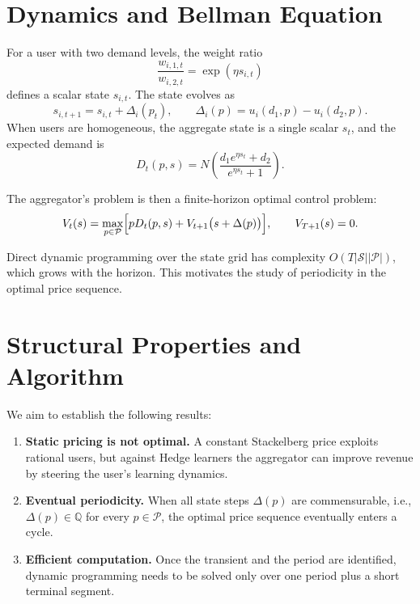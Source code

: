 \documentclass[conference]{IEEEtran}
\begin{document}
\section{Dynamics and Bellman Equation}
For a user with two demand levels, the weight ratio
\begin{equation}
    \frac{w_{i,1,t}}{w_{i,2,t}} = \exp(\eta s_{i,t})
\end{equation}
defines a scalar state $s_{i,t}$. The state evolves as
\begin{equation}
    s_{i,t+1} = s_{i,t} + \Delta_i(p_t),
\qquad
    \Delta_i(p) = u_i(d_1, p) - u_i(d_2, p).
\end{equation}
When users are homogeneous, the aggregate state is a single scalar $s_t$, and the expected demand is
\begin{equation}
    D_t(p, s) = N \left( \frac{d_1 e^{\eta s_t} + d_2}{e^{\eta s_t} + 1} \right).
\end{equation}

The aggregator's problem is then a finite-horizon optimal control problem:
\begin{equation}
    V_t(s) = \max_{p \in \mathcal{P}} \Bigl[ p D_t(p, s) + V_{t+1}\bigl(s + \Delta(p)\bigr) \Bigr],
\qquad
    V_{T+1}(s) = 0.
\end{equation}

Direct dynamic programming over the state grid has complexity $O(T |\mathcal{S}| |\mathcal{P}|)$, which grows with the horizon. This motivates the study of periodicity in the optimal price sequence.

\section{Structural Properties and Algorithm}
We aim to establish the following results:
\begin{enumerate}
    \item \textbf{Static pricing is not optimal.} A constant Stackelberg price exploits rational users, but against Hedge learners the aggregator can improve revenue by steering the user's learning dynamics.
    \item \textbf{Eventual periodicity.} When all state steps $\Delta(p)$ are commensurable, i.e., $\Delta(p) \in \mathbb{Q}$ for every $p \in \mathcal{P}$, the optimal price sequence eventually enters a cycle.
    \item \textbf{Efficient computation.} Once the transient and the period are identified, dynamic programming needs to be solved only over one period plus a short terminal segment.
\end{enumerate}
\end{document}
